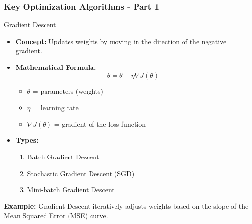 \documentclass[aspectratio=169]{beamer}
\begin{document}
\begin{frame}[fragile]
    \frametitle{Key Optimization Algorithms - Part 1}
    \begin{block}{Gradient Descent}
        \begin{itemize}
            \item \textbf{Concept:} Updates weights by moving in the direction of the negative gradient.
            \item \textbf{Mathematical Formula:}
            \begin{equation}
                \theta = \theta - \eta \nabla J(\theta)
            \end{equation}
            \begin{itemize}
                \item $\theta$ = parameters (weights)
                \item $\eta$ = learning rate
                \item $\nabla J(\theta)$ = gradient of the loss function
            \end{itemize}
            \item \textbf{Types:}
            \begin{enumerate}
                \item Batch Gradient Descent
                \item Stochastic Gradient Descent (SGD)
                \item Mini-batch Gradient Descent
            \end{enumerate}
        \end{itemize}
        \textbf{Example:} Gradient Descent iteratively adjusts weights based on the slope of the Mean Squared Error (MSE) curve.
    \end{block}
\end{frame}
\end{document}
